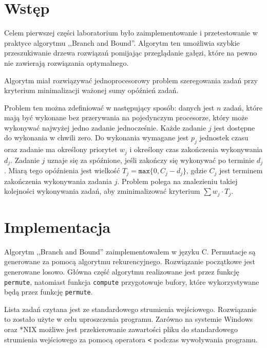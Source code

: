 \section{Wstęp} %
  \label{sec:wstep}

  Celem pierwszej części laboratorium było zaimplementowanie i przetestowanie
  w praktyce algorytmu ,,Branch and Bound''. Algorytm ten umożliwia szybkie
  przeszukiwanie drzewa rozwiązań pomijając przeglądanie gałęzi, które na pewno
  nie zawierają rozwiązania optymalnego.
  \vspace{1em}

  Algorytm miał rozwiązywać jednoprocesorowy problem szeregowania zadań przy
  kryterium minimalizacji ważonej sumy opóźnień zadań.
  \vspace{1em}

  Problem ten można zdefiniować w następujący sposób: danych jest $n$ zadań,
  które mają być wykonane bez przerywania na pojedynczym procesorze, który może
  wykonywać najwyżej jedno zadanie jednocześnie.
  Każde zadanie $j$ jest dostępne do wykonania w chwili zero. Do wykonania
  wymagane jest $p_j$ jednostek czasu oraz zadanie ma określony priorytet $w_j$
  i określony czas zakończenia wykonywania $d_j$.
  Zadanie $j$ uznaje się za spóźnione, jeśli zakończy się wykonywać po terminie
  $d_j$. Miarą tego opóźnienia jest wielkość $T_j = \texttt{max}\{0, C_j - d_j\}$,
  gdzie $C_j$ jest terminem zakończenia wykonywania zadania $j$. Problem polega
  na znalezieniu takiej kolejności wykonywania zadań, aby zminimalizować
  kryterium $\sum w_j \cdot T_j$.


\section{Implementacja} %
  \label{sec:impl}

  Algorytm ,,Branch and Bound'' zaimplementowałem w języku C. Permutacje są
  generowane za pomocą algorytmu rekurencyjnego. Rozwiązanie początkowe jest
  generowane losowo. Główna część algorytmu realizowane jest przez funkcję
  \texttt{permute}, natomiast funkcja \texttt{compute} przygotowuje bufory,
  które wykorzystywane będą przez funkcję \texttt{permute}.
  \vspace{1em}

  Lista zadań czytana jest ze standardowego strumienia wejściowego. Rozwiązanie
  to zostało użyte w celu uproszczenia programu. Zarówno na systemie Windows
  oraz *NIX możliwe jest przekierowanie zawartości pliku do standardowego
  strumienia wejściowego za pomocą operatora \texttt{<} podczas wywoływania
  programu.
  \vspace{1em}

